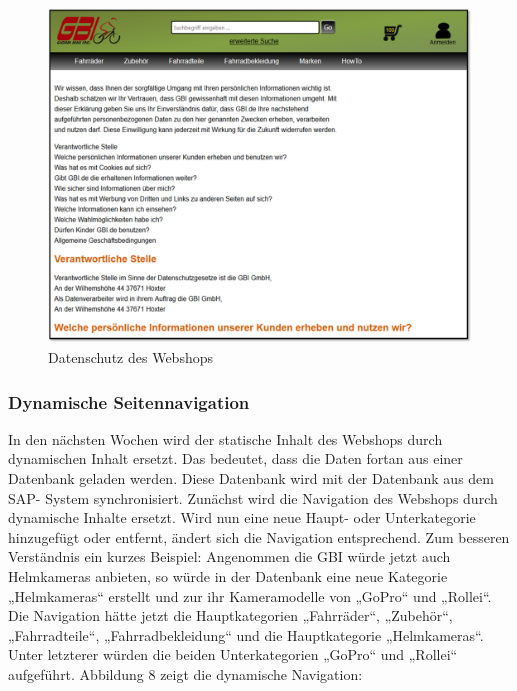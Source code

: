 \begin{figure}[H]
\begin{center}
\includegraphics[width=150mm]{Bilder/Abbildung8-DatenschutzDesWebshops.png}
\end{center}
\caption{Datenschutz des Webshops}
\label{Abbildung7-Datenschutz des Webshops}
\end{figure}

\subsubsection{Dynamische Seitennavigation}

In den nächsten Wochen wird der statische Inhalt des Webshops durch dynamischen Inhalt ersetzt. Das bedeutet, dass die Daten fortan aus einer Datenbank geladen werden. Diese Datenbank wird mit der Datenbank aus dem SAP- System synchronisiert. Zunächst wird die Navigation des Webshops durch dynamische Inhalte ersetzt. Wird nun eine neue Haupt- oder Unterkategorie hinzugefügt oder entfernt, ändert sich die Navigation entsprechend. Zum besseren Verständnis ein kurzes Beispiel: Angenommen die GBI würde jetzt auch Helmkameras anbieten, so würde in der Datenbank eine neue Kategorie „Helmkameras“ erstellt und zur ihr Kameramodelle von „GoPro“ und „Rollei“. Die Navigation hätte jetzt die Hauptkategorien „Fahrräder“, „Zubehör“, „Fahrradteile“, „Fahrradbekleidung“ und die Hauptkategorie „Helmkameras“. Unter letzterer würden die beiden Unterkategorien „GoPro“ und „Rollei“ aufgeführt. Abbildung 8 zeigt die dynamische Navigation:

